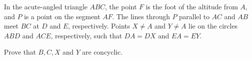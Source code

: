 In the acute-angled triangle $ABC$, the point $F$ is the foot of the altitude from $A$, and $P$ is a point on the segment $AF$. The lines through $P$ parallel to $AC$ and $AB$ meet $BC$ at $D$ and $E$, respectively. Points $X \neq A$ and $Y \neq A$ lie on the circles $ABD$ and $ACE$, respectively, such that $DA = DX$ and $EA = EY$.

Prove that $B, C, X$ and $Y$ are concyclic.
